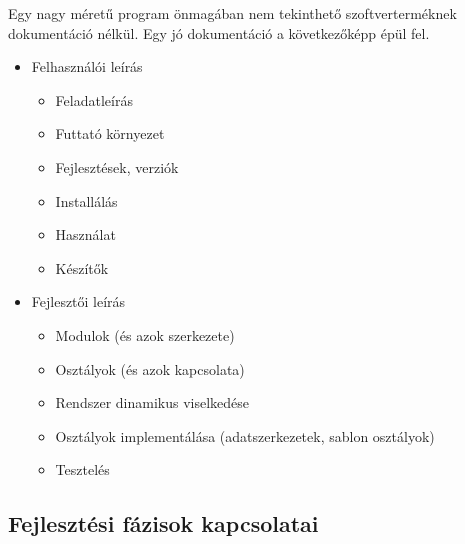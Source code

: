 \documentclass[margin=0px]{article}
\begin{document}
\begin{enumerate}
			Egy nagy méretű program önmagában nem tekinthető szoftverterméknek
			dokumentáció nélkül. Egy jó dokumentáció a következőképp épül fel.
			\begin{itemize}
				\item Felhasználói leírás
					\begin{itemize}
						\item Feladatleírás
						\item Futtató környezet
						\item Fejlesztések, verziók
						\item Installálás
						\item Használat
						\item Készítők
					\end{itemize}
				\item Fejlesztői leírás
					\begin{itemize}
						\item Modulok (és azok szerkezete)
						\item Osztályok (és azok kapcsolata)
						\item Rendszer dinamikus viselkedése
						\item Osztályok implementálása (adatszerkezetek, sablon osztályok)
						\item Tesztelés
					\end{itemize}
			\end{itemize}	
		\end{enumerate}
		
		\subsection{Fejlesztési fázisok kapcsolatai}
		
\end{document}
